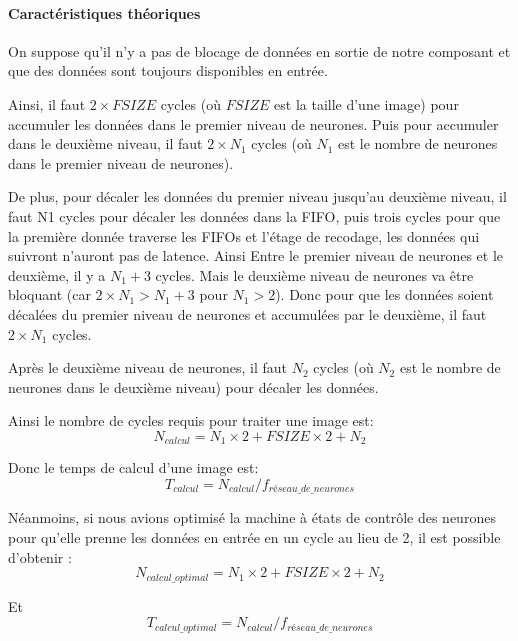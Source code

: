 \paragraph{Caractéristiques théoriques\\}

On suppose qu'il n'y a pas de blocage de données en sortie de notre
composant et que des données sont toujours disponibles en entrée.

Ainsi, il faut $2\times FSIZE$ cycles (où $FSIZE$ est la taille d'une image)
pour accumuler les données dans le premier
niveau de neurones. Puis pour accumuler dans le deuxième niveau, il faut
$2\times N_1$ cycles (où $N_1$ est le nombre de neurones dans le premier niveau de
neurones).

De plus, pour décaler les données du premier niveau jusqu'au deuxième
niveau, il faut N1 cycles pour décaler les données dans la FIFO, puis trois cycles
pour que la première donnée traverse les FIFOs et l'étage de recodage, les données
qui suivront n'auront pas de latence. Ainsi Entre le premier niveau de neurones
et le deuxième, il y a $N_1 + 3$ cycles.
Mais le deuxième niveau de neurones va être bloquant (car $2\times N_1 > N_1 +3$
pour $N_1 > 2$). Donc pour que les données soient décalées du premier
niveau de neurones et accumulées par le deuxième, il faut $2\times N_1$ cycles.

Après le deuxième niveau de neurones, il faut $N_2$ cycles (où $N_2$
est le nombre de neurones dans le deuxième niveau) pour décaler les données.

Ainsi le nombre de cycles requis pour traiter une image est:
\begin{equation}
	N_{calcul} = N_1 \times 2 + FSIZE \times 2 + N_2
\end{equation}

Donc le temps de calcul d'une image est:
\begin{equation}
	T_{calcul} = N_{calcul}/f_{réseau\_de\_neurones}
\end{equation}

Néanmoins, si nous avions optimisé la machine à états de contrôle des neurones pour
qu'elle prenne les données en entrée en un cycle au lieu de 2, il est possible
d'obtenir :
\begin{equation}
	N_{calcul\_optimal} = N_1 \times 2 + FSIZE \times 2 + N_2
\end{equation}

Et
\begin{equation}
	T_{calcul\_optimal} = N_{calcul}/f_{réseau\_de\_neurones}
\end{equation}

